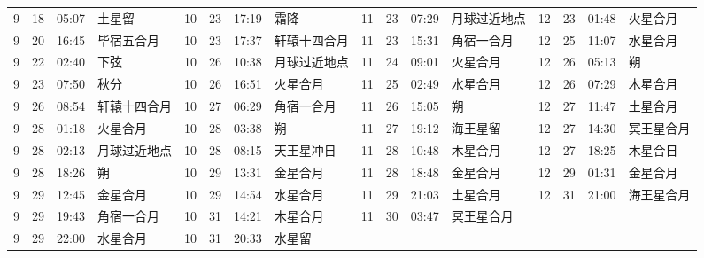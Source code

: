 \begin{tabular}{llll|llll|llll|llll}
9 & 18 & 05:07 & 土星留 & 10 & 23 & 17:19 & 霜降 & 11 & 23 & 07:29 & 月球过近地点 & 12 & 23 & 01:48 & 火星合月 \tabularnewline
9 & 20 & 16:45 & 毕宿五合月 & 10 & 23 & 17:37 & 轩辕十四合月 & 11 & 23 & 15:31 & 角宿一合月 & 12 & 25 & 11:07 & 水星合月 \tabularnewline
9 & 22 & 02:40 & 下弦 & 10 & 26 & 10:38 & 月球过近地点 & 11 & 24 & 09:01 & 火星合月 & 12 & 26 & 05:13 & 朔 \tabularnewline
9 & 23 & 07:50 & 秋分 & 10 & 26 & 16:51 & 火星合月 & 11 & 25 & 02:49 & 水星合月 & 12 & 26 & 07:29 & 木星合月 \tabularnewline
9 & 26 & 08:54 & 轩辕十四合月 & 10 & 27 & 06:29 & 角宿一合月 & 11 & 26 & 15:05 & 朔 & 12 & 27 & 11:47 & 土星合月 \tabularnewline
9 & 28 & 01:18 & 火星合月 & 10 & 28 & 03:38 & 朔 & 11 & 27 & 19:12 & 海王星留 & 12 & 27 & 14:30 & 冥王星合月 \tabularnewline
9 & 28 & 02:13 & 月球过近地点 & 10 & 28 & 08:15 & 天王星冲日 & 11 & 28 & 10:48 & 木星合月 & 12 & 27 & 18:25 & 木星合日 \tabularnewline
9 & 28 & 18:26 & 朔 & 10 & 29 & 13:31 & 金星合月 & 11 & 28 & 18:48 & 金星合月 & 12 & 29 & 01:31 & 金星合月 \tabularnewline
9 & 29 & 12:45 & 金星合月 & 10 & 29 & 14:54 & 水星合月 & 11 & 29 & 21:03 & 土星合月 & 12 & 31 & 21:00 & 海王星合月 \tabularnewline
9 & 29 & 19:43 & 角宿一合月 & 10 & 31 & 14:21 & 木星合月 & 11 & 30 & 03:47 & 冥王星合月 &  &  &  &  \tabularnewline
9 & 29 & 22:00 & 水星合月 & 10 & 31 & 20:33 & 水星留 &  &  &  &  &  &  &  &  \tabularnewline
\hline \end{tabular}
